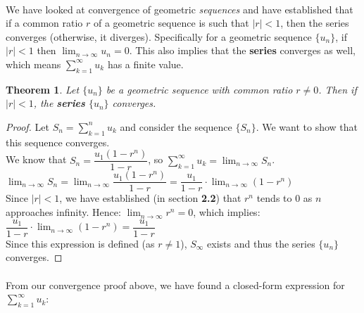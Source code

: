 \documentclass[12pt, a4paper, titlepage, twoside]{article}
\newtheorem*{theorem*}{Theorem}
\begin{document}
	\paragraph{}
	We have looked at convergence of geometric \textit{sequences} and have established that if a common ratio $r$ of a geometric
	sequence is such that $|r| < 1$, then the series converges (otherwise, it diverges). Specifically for a geometric sequence $\{u_n\}$, 
	if $|r| < 1$ then $\displaystyle \lim_{n \to \infty} u_n = 0$. This also implies that the \textbf{series} converges as well, which
	means $\displaystyle \sum_{k=1}^{\infty} u_k$ has a finite value.\\
	
	\begin{pf}
		\begin{theorem*}
			Let $\{u_n\}$ be a geometric sequence with common ratio $r \neq 0$. Then if $|r| < 1$, the \textbf{series} $\{u_n\}$ converges.
		\end{theorem*}
		
		\tcbline
		
		\begin{proof}
			Let $S_n = \displaystyle \sum_{k=1}^n u_k$ and consider the sequence $\{S_n\}$. We want to show that this sequence
			converges.\\
			
			We know that $S_n = \dfrac{u_1 (1 - r^n)}{1 - r}$, so $\displaystyle \sum_{k=1}^\infty u_k = \lim_{n \to \infty} S_n$.\\
			
			$\displaystyle \lim_{n \to \infty} S_n = \lim_{n \to \infty} \dfrac{u_1 (1 - r^n)}{1 - r} = \dfrac{u_1}{1-r} \cdot \lim_{n \to \infty}
			(1-r^n)$\\
			
			Since $|r| < 1$, we have established (in section \textbf{2.2}) that $r^n$ tends to 0 as $n$ approaches infinity. Hence:
			$\displaystyle \lim_{n \to \infty} r^n = 0$, which implies:\\
			
			$\displaystyle \dfrac{u_1}{1-r} \cdot \lim_{n \to \infty} (1-r^n) = \dfrac{u_1}{1-r}$\\
			
			Since this expression is defined (as $r \neq 1$), $S_{\infty}$ exists and thus the series $\{u_n\}$ converges.
		\end{proof}
	\end{pf}
	
	\paragraph{}
	From our convergence proof above, we have found a closed-form expression for $\displaystyle \sum_{k=1}^\infty u_k$:\\
	
\end{document}
